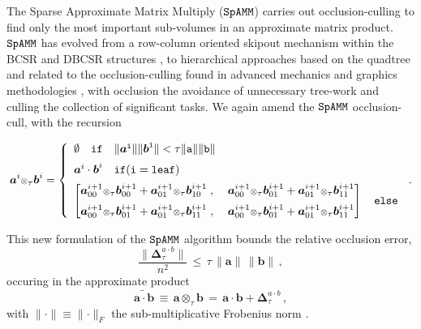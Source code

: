 \documentclass[letterpaper,twocolumn,amsmath,amsfont,amssymb,english,aps,jcp,preprintnumbers,groupaddress,nofootinbib,tightenlines,floatfix]{revtex4}
\newcommand{\mat}[1]{\boldsymbol{#1}}
\newcommand{\ot}{  {\scriptstyle \otimes}_{ \tau } }
\theoremstyle{plain}
\theoremstyle{remark}
\theoremstyle{plain}
\begin{document}
The Sparse Approximate Matrix Multiply ($\tt SpAMM$) carries out occlusion-culling to find only the
most important sub-volumes in an approximate matrix product. 
$\tt SpAMM$ has evolved from a row-column oriented skipout mechanism within the
BCSR and DBCSR structures \cite{challacombe1999simplified,Challacombe:2000:SpMM}, 
to hierarchical approaches based on the quadtree and related to 
the occlusion-culling found in advanced mechanics and graphics methodologies \cite{Challacombe2010}, 
with occlusion the avoidance of unnecessary tree-work and culling the collection of significant tasks. 
We again amend the $\tt SpAMM$ occlusion-cull,  with the recursion
\begin{widetext}
\begin{equation}\label{newspamm}
\mat{a}^{i} \ot \mat{b}^{i} =
\left\{
        \begin{array}{ll}
                 \emptyset \quad \tt{if}\quad \lVert \mat{a}^i \rVert \lVert \mat{b}^i \rVert < \tau \lVert a \rVert \lVert b \rVert \\[0.2cm]
                 \mat{a} ^i \cdot \mat{b}^i \quad  \tt{if}(i=\tt{leaf}) \\[0.2cm]
\begin{bmatrix} \mat{a}^{i+1}_{00} \ot \mat{b}^{i+1}_{00} +\mat{a}^{i+1}_{01} \ot \mat{b}^{i+1}_{10} \; , \; &
                \mat{a}^{i+1}_{00} \ot \mat{b}^{i+1}_{01} +\mat{a}^{i+1}_{01} \ot \mat{b}^{i+1}_{11}  \\[0.2cm]
                \mat{a}^{i+1}_{00} \ot \mat{b}^{i+1}_{01} +\mat{a}^{i+1}_{01} \ot \mat{b}^{i+1}_{11} \; , \; &
                \mat{a}^{i+1}_{00} \ot \mat{b}^{i+1}_{01} +\mat{a}^{i+1}_{01} \ot \mat{b}^{i+1}_{11}
\end{bmatrix}  \quad \tt{else}
                \end{array}
              \right.  \, .
\end{equation}
\end{widetext}
This new formulation of the $\tt SpAMM$ algorithm bounds the relative occlusion error,
\begin{equation}\label{bound}
\frac{\lVert \mat{\Delta}^{a \cdot b}_{\tau} \rVert}{n^2 }  \, \leq \, \tau \, \lVert \mat{a} \rVert  \,  \lVert \mat{b} \rVert \, ,
\end{equation}
occuring in the approximate product
\begin{equation}
\widetilde{\mat{a}\cdot \mat{b}} \,  \equiv \, \mat{a} \ot \mat{b} \,
  = \, \mat{a} \cdot \mat{b} + \mat{\Delta}^{a \cdot b}_{\tau} \, ,
\end{equation}
with $\lVert \cdot \rVert \equiv \lVert \cdot \rVert_F$ the sub-multiplicative Frobenius norm \cite{Kahan2013}.
\end{document}

